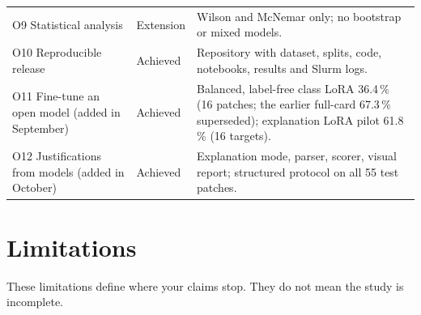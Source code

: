 \begin{longtable}{L{4.2cm}L{2.0cm}L{8.0cm}}
O9 Statistical analysis & Extension & Wilson and McNemar only; no bootstrap or mixed models. \\
O10 Reproducible release & Achieved & Repository with dataset, splits, code, notebooks, results and Slurm logs. \\
O11 Fine-tune an open model (added in September) & Achieved & Balanced, label-free class LoRA 36.4\,\% (16 patches; the earlier full-card 67.3\,\% superseded); explanation LoRA pilot 61.8\,\% (16 targets). \\
O12 Justifications from models (added in October) & Achieved & Explanation mode, parser, scorer, visual report; structured protocol on all 55 test patches. \\
\bottomrule
\end{longtable}

\section{Limitations}
\label{sec:limits}

These limitations define where your claims stop. They do not mean the study is incomplete.

